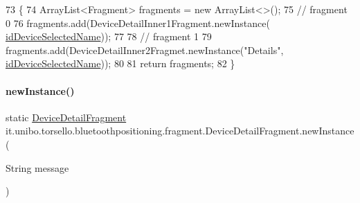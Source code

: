 \begin{DoxyCode}
73                                                \{
74         ArrayList<Fragment> fragments = \textcolor{keyword}{new} ArrayList<>();
75         \textcolor{comment}{// fragment 0}
76         fragments.add(DeviceDetailInner1Fragment.newInstance(
      \hyperlink{classit_1_1unibo_1_1torsello_1_1bluetoothpositioning_1_1fragment_1_1DeviceDetailFragment_a6d52d8371a07fb8da75879758d1d6942_a6d52d8371a07fb8da75879758d1d6942}{idDeviceSelectedName}));
77 
78         \textcolor{comment}{// fragment 1}
79         fragments.add(DeviceDetailInner2Fragmet.newInstance(\textcolor{stringliteral}{"Details"}, 
      \hyperlink{classit_1_1unibo_1_1torsello_1_1bluetoothpositioning_1_1fragment_1_1DeviceDetailFragment_a6d52d8371a07fb8da75879758d1d6942_a6d52d8371a07fb8da75879758d1d6942}{idDeviceSelectedName}));
80 
81         \textcolor{keywordflow}{return} fragments;
82     \}
\end{DoxyCode}
\hypertarget{classit_1_1unibo_1_1torsello_1_1bluetoothpositioning_1_1fragment_1_1DeviceDetailFragment_a626de18d36d44ae0b4ff21c2527bdf5a_a626de18d36d44ae0b4ff21c2527bdf5a}{}\label{classit_1_1unibo_1_1torsello_1_1bluetoothpositioning_1_1fragment_1_1DeviceDetailFragment_a626de18d36d44ae0b4ff21c2527bdf5a_a626de18d36d44ae0b4ff21c2527bdf5a} 
\paragraph{\texorpdfstring{new\+Instance()}{newInstance()}}
{\footnotesize\ttfamily static \hyperlink{classit_1_1unibo_1_1torsello_1_1bluetoothpositioning_1_1fragment_1_1DeviceDetailFragment}{Device\+Detail\+Fragment} it.\+unibo.\+torsello.\+bluetoothpositioning.\+fragment.\+Device\+Detail\+Fragment.\+new\+Instance (\begin{DoxyParamCaption}\item[{String}]{message }\end{DoxyParamCaption})\hspace{0.3cm}{\ttfamily [static]}}


